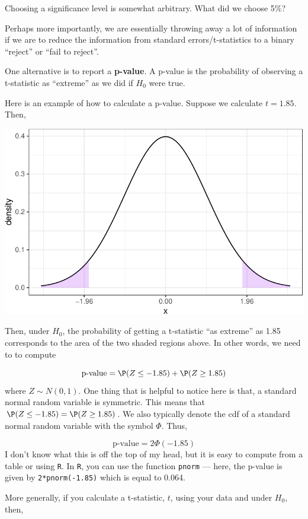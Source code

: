 \documentclass[
  letterpaper,
  DIV=11,
  numbers=noendperiod]{scrreprt}
\begin{document}
Choosing a significance level is somewhat arbitrary. What did we choose
5\%?

Perhaps more importantly, we are essentially throwing away a lot of
information if we are to reduce the information from standard
errors/t-statistics to a binary ``reject'' or ``fail to reject''.

One alternative is to report a \textbf{p-value}. A p-value is the
probability of observing a t-statistic as ``extreme'' as we did if
\(H_0\) were true.

Here is an example of how to calculate a p-value. Suppose we calculate
\(t=1.85\). Then,

\includegraphics{07-inference_files/figure-pdf/unnamed-chunk-3-1.pdf}

Then, under \(H_0\), the probability of getting a t-statistic ``as
extreme'' as 1.85 corresponds to the area of the two shaded regions
above. In other words, we need to to compute

\[
  \textrm{p-value} = \P(Z \leq -1.85) + \P(Z \geq 1.85)
\] where \(Z \sim N(0,1)\). One thing that is helpful to notice here is
that, a standard normal random variable is symmetric. This means that
\(\P(Z \leq -1.85) = \P(Z \geq 1.85)\). We also typically denote the cdf
of a standard normal random variable with the symbol \(\Phi\). Thus,

\[
  \textrm{p-value} = 2 \Phi(-1.85)
\] I don't know what this is off the top of my head, but it is easy to
compute from a table or using \texttt{R}. In \texttt{R}, you can use the
function \texttt{pnorm} --- here, the p-value is given by
\texttt{2*pnorm(-1.85)} which is equal to 0.064.

More generally, if you calculate a t-statistic, \(t\), using your data
and under \(H_0\), then,
\end{document}
